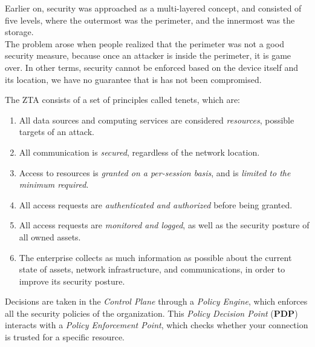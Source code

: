 Earlier on, security was approached as a multi-layered concept, and consisted of five levels, where the outermost was the perimeter, and the innermost was the storage.\\
The problem arose when people realized that the perimeter was not a good security measure, because once an attacker is inside the perimeter, it is game over. In other terms, security cannot be enforced based on the device itself and its location, we have no guarantee that is has not been compromised.
\nl


{The ZTA consists of a set of principles called tenets, which are:\ns
\begin{enumerate}
   \item All data sources and computing services are considered \textit{resources}, possible targets of an attack.
   \item All communication is \textit{secured}, regardless of the network location.
   \item Access to resources is \textit{granted on a per-session basis}, and is \textit{limited to the minimum required}.
   \item All access requests are \textit{authenticated and authorized} before being granted.
   \item All access requests are \textit{monitored and logged}, as well as the security posture of all owned assets.
   \item The enterprise collects as much information as possible about the current state of assets, network infrastructure, and communications, in order to improve its security posture.
\end{enumerate}}

Decisions are taken in the \textit{Control Plane} through a \textit{Policy Engine}, which enforces all the security policies of the organization. 
This \textit{Policy Decision Point} (\textbf{PDP}) interacts with a \textit{Policy Enforcement Point}, which checks whether your connection is trusted for a specific resource.


